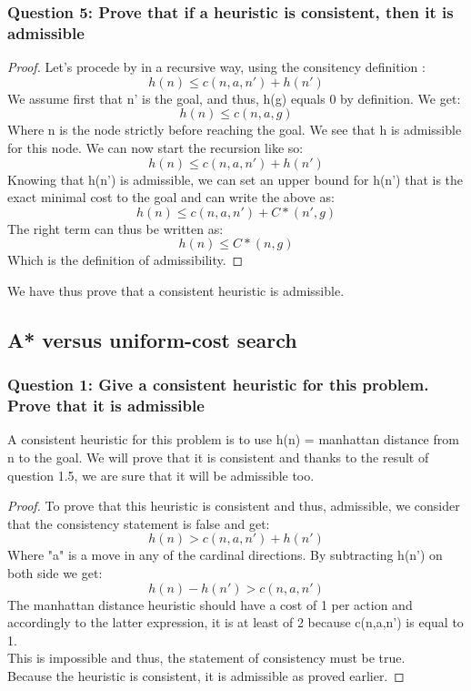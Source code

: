 \documentclass[a4paper,10pt]{article}
\begin{document}
			\subsubsection{Question 5: Prove that if a heuristic is consistent, then it is admissible}
			
				\begin{proof}
					Let's procede by in a recursive way, using the consitency definition :						$$ h(n) \leq c(n,a,n') + h(n') $$
					We assume first that n' is the goal, and thus, h(g) equals 0 by definition. We get:
					$$ h(n) \leq c(n,a,g) $$
					Where n is the node strictly before reaching the goal. We see that h is admissible for this node. We can now start the recursion like so:
					$$ h(n) \leq c(n,a,n') + h(n') $$
					Knowing that h(n') is admissible, we can set an upper bound for h(n') that is the exact minimal cost to the goal and can write the above as:
					$$ h(n) \leq c(n,a,n') + C*(n', g) $$
					The right term can thus be written as:
					$$ h(n) \leq C*(n, g) $$
					Which is the definition of admissibility.        
				\end{proof}
				We have thus prove that a consistent heuristic is admissible.
				
		\subsection{A* versus uniform-cost search}
			\subsubsection{Question 1: Give a consistent heuristic for this problem. Prove that it is admissible}
				A consistent heuristic for this problem is to use h(n) = manhattan distance from n to the goal. We will prove that it is consistent and thanks to the result of question 1.5, we are sure that it will be admissible too.
				\begin{proof}
					To prove that this heuristic is consistent and thus, admissible, we consider that the consistency statement is false and get:
					$$ h(n) > c(n,a,n') + h(n') $$
					Where "a" is a move in any of the cardinal directions.
					By subtracting h(n') on both side we get:
					$$ h(n) - h(n') > c(n,a,n') $$
					The manhattan distance heuristic should have a cost of 1 per action and accordingly to the latter expression, it is at least of 2 because c(n,a,n') is equal to 1.\\
					This is impossible and thus, the statement of consistency must be true.\\
					Because the heuristic is consistent, it is admissible as proved earlier.   
				\end{proof}  				
				
\end{document}
